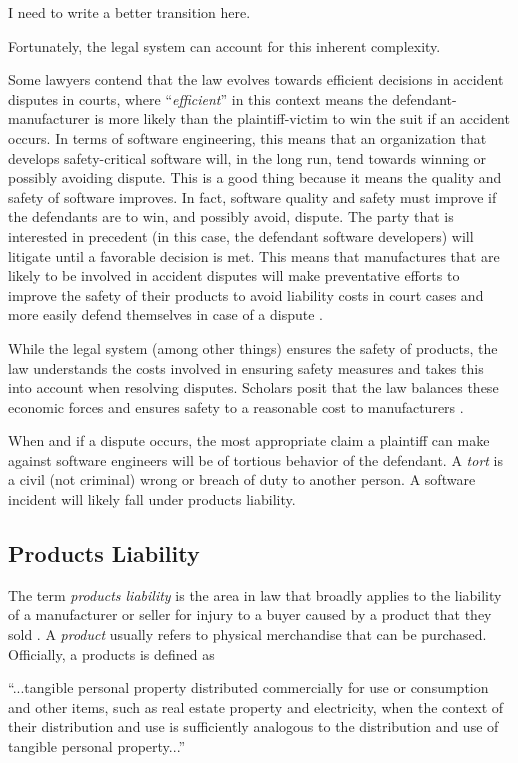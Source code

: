\documentclass[12pt]{report}
\begin{document}
I need to write a better transition here.

Fortunately, the legal system can account for this inherent complexity.

Some lawyers contend that the law evolves towards efficient decisions in accident disputes in courts, where ``\textit{efficient}'' in this context means the defendant-manufacturer is more likely than the plaintiff-victim to win the suit if an accident occurs. In terms of software engineering, this means that an organization that develops safety-critical software will, in the long run, tend towards winning or possibly avoiding dispute. This is a good thing because it means the quality and safety of software improves. In fact, software quality and safety must improve if the defendants are to win, and possibly avoid, dispute. The party that is interested in precedent (in this case, the defendant software developers) will litigate until a favorable decision is met. This means that manufactures that are likely to be involved in accident disputes will make preventative efforts to improve the safety of their products to avoid liability costs in court cases and more easily defend themselves in case of a dispute \cite{FAKE}.


While the legal system (among other things) ensures the safety of products, the law understands the costs involved in ensuring safety measures and takes this into account when resolving disputes. Scholars posit that the law balances these economic forces and ensures safety to a reasonable cost to manufacturers \cite{FAKE}.

When and if a dispute occurs, the most appropriate claim a plaintiff can make against software engineers will be of tortious behavior of the defendant. A \textit{tort} is a civil (not criminal) wrong or breach of duty to another person. A software incident will likely fall under products liability.

\subsection{Products Liability} 
The term \textit{products liability} is the area in law that broadly applies to the liability of a manufacturer or seller for injury to a buyer caused by a product that they sold \cite{FAKE}. A \textit{product} usually refers to physical merchandise that can be purchased. Officially, a products is defined as 

``...tangible personal property distributed commercially for use or consumption and other items, such as real estate property and electricity, when the context of their distribution and use is sufficiently analogous to the distribution and use of tangible personal property...\cite{FAKE}'' 
\end{document}
